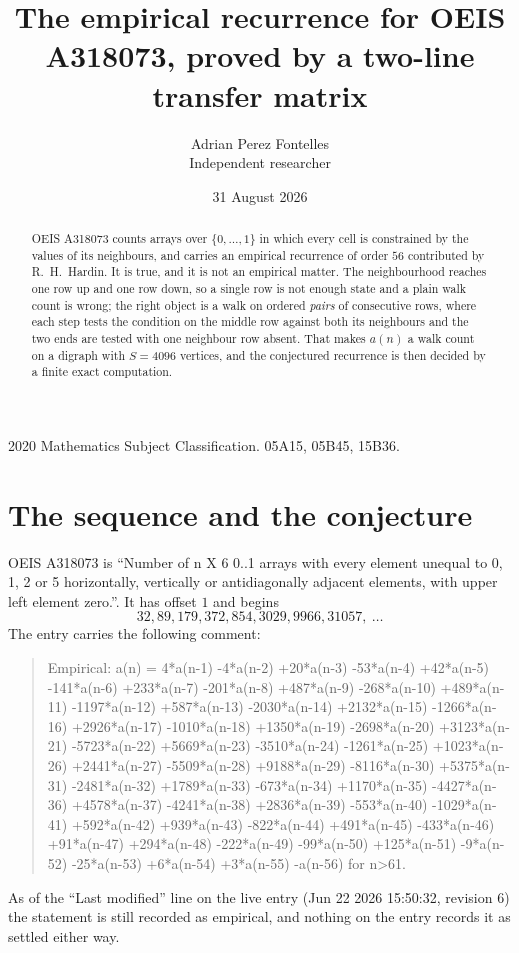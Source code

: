 \documentclass[11pt,a4paper]{article}
\title{The empirical recurrence for OEIS A318073, proved by a two-line transfer matrix}
\author{Adrian Perez Fontelles\\ \small Independent researcher}
\date{31 August 2026}
\theoremstyle{plain}
\theoremstyle{definition}
\begin{document}
\maketitle

\begin{abstract}
OEIS A318073 counts arrays over $\{0,\dots,1\}$ in which every cell is constrained by the
values of its neighbours, and carries an empirical recurrence of order $56$ contributed
by R.~H.~Hardin. It is true, and it is not an empirical matter. The neighbourhood reaches one
row up and one row down, so a single row is not enough state and a plain walk count
is wrong; the right object is a walk on ordered \emph{pairs} of consecutive rows, where
each step tests the condition on the middle row against both its neighbours and the two
ends are tested with one neighbour row absent. That makes $a(n)$ a walk count on a digraph
with $S=4096$ vertices, and the conjectured recurrence is then decided by a finite exact
computation.
\end{abstract}

\noindent\small 2020 Mathematics Subject Classification. 05A15, 05B45, 15B36.\normalsize

\section{The sequence and the conjecture}

OEIS A318073 is ``Number of n X 6 0..1 arrays with every element unequal to 0, 1, 2 or 5 horizontally, vertically or antidiagonally adjacent elements, with upper left element zero.''. It has offset $1$ and begins
\[
32, 89, 179, 372, 854, 3029, 9966, 31057,\ \dots
\]
The entry carries the following comment:
\begin{quote}\small
Empirical: a(n) = 4*a(n-1) -4*a(n-2) +20*a(n-3) -53*a(n-4) +42*a(n-5) -141*a(n-6) +233*a(n-7) -201*a(n-8) +487*a(n-9) -268*a(n-10) +489*a(n-11) -1197*a(n-12) +587*a(n-13) -2030*a(n-14) +2132*a(n-15) -1266*a(n-16) +2926*a(n-17) -1010*a(n-18) +1350*a(n-19) -2698*a(n-20) +3123*a(n-21) -5723*a(n-22) +5669*a(n-23) -3510*a(n-24) -1261*a(n-25) +1023*a(n-26) +2441*a(n-27) -5509*a(n-28) +9188*a(n-29) -8116*a(n-30) +5375*a(n-31) -2481*a(n-32) +1789*a(n-33) -673*a(n-34) +1170*a(n-35) -4427*a(n-36) +4578*a(n-37) -4241*a(n-38) +2836*a(n-39) -553*a(n-40) -1029*a(n-41) +592*a(n-42) +939*a(n-43) -822*a(n-44) +491*a(n-45) -433*a(n-46) +91*a(n-47) +294*a(n-48) -222*a(n-49) -99*a(n-50) +125*a(n-51) -9*a(n-52) -25*a(n-53) +6*a(n-54) +3*a(n-55) -a(n-56) for n>61.
\end{quote}
As of the ``Last modified'' line on the live entry (Jun 22 2026 15:50:32, revision 6) the statement is
still recorded as empirical, and nothing on the entry records it as settled either way.
\end{document}
